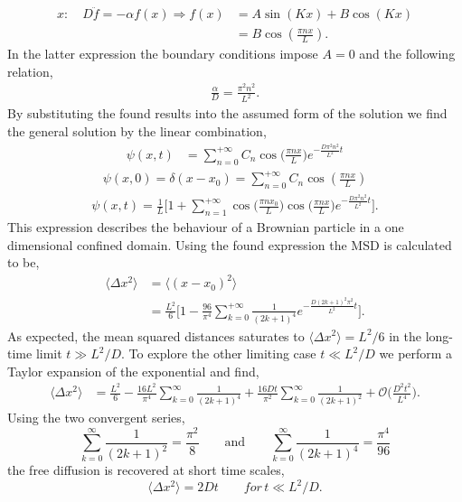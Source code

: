 \begin{align}
  x:\quad D \ddot{f} = - \alpha f(x) \Rightarrow f(x) &= A \sin(K x) + B \cos(Kx)\\
  &= B \cos(\frac{\pi n x}{L}).
\end{align}
In the latter expression the boundary conditions impose $A=0$ and the following relation,
\begin{align}
  \frac{\alpha}{D} = \frac{\pi^2 n^2}{L^2}.
\end{align}
By substituting the found results into the assumed form of the solution we find the
general solution by the linear combination,
\begin{align}
  \psi(x,t) &= \sum_{n=0}^{+\infty} C_n \cos\Big(\frac{\pi n x}{L}\Big) e^{- \frac{D\pi^2
  n^2}{L^2}t}
\end{align}
\begin{align}
  \psi(x, 0) = \delta(x-x_0) = \sum_{n=0}^{+ \infty} C_n \cos(\frac{\pi n x}{L})
\end{align}
\begin{align}
  \psi(x, t)=\frac{1}{L} \Bigg[ 1 + \sum_{n=1}^{+\infty} \cos\Big(\frac{\pi n
  x_0}{L}\Big) \cos\Big(\frac{\pi n x}{L}\Big) e^{- \frac{D\pi^2  n^2}{L^2}t}\Bigg].
\end{align}
This expression describes the behaviour of a Brownian particle in a one dimensional
confined domain. Using the found expression the MSD is calculated to be,
\begin{align}
  \langle \Delta x^2 \rangle &= \langle(x-x_0)^2\rangle\\&= \frac{L^2}{6}\Bigg[1 -
  \frac{96}{\pi^4}
  \sum_{k=0}^{+\infty} \frac{1}{(2k+1)^4} e^{- \frac{D(2k+1)^2 \pi^2}{L^2}t}\Bigg].
\end{align}
As expected, the mean squared distances saturates to $\langle \Delta x^2 \rangle = L^2/6$
in the long-time limit $t \gg L^2 / D.$ To explore the other limiting case $t \ll L^2/D
$ we perform a Taylor expansion of the exponential and find,
\begin{align}
  \langle \Delta x^2 \rangle &= \frac{L^2}{6} - \frac{16 L^2}{\pi^4} \sum_{k=0}^{\infty}
  \frac{1}{(2k+1)^4} + \frac{16 D t}{\pi^2} \sum_{k=0}^{\infty} \frac{1}{(2k+1)^2} +
  \mathcal{O}\bigg(\frac{D^2 t^2}{L^4}\bigg).
\end{align}
Using the two convergent series,
\begin{equation}
  \sum_{k=0}^{\infty} \frac{1}{(2k+1)^2} = \frac{\pi^2}{8} \qquad \text{and} \qquad
  \sum_{k=0}^{\infty} \frac{1}{(2k+1)^4} = \frac{\pi^4}{96}
\end{equation}
the free diffusion is recovered at short time scales, \cite{BICKEL200724}
\begin{equation}
\langle \Delta x^2 \rangle = 2Dt \qquad for\, t \ll L^2/D.
\end{equation}
